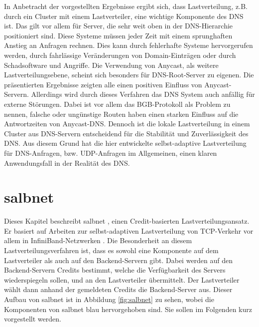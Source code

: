 \documentclass[a4paper, 12pt, BCOR10mm, DIV12, toc=bibliography, toc=listof, german]{scrbook}
\begin{document}
	In Anbetracht der vorgestellten Ergebnisse ergibt sich, dass Lastverteilung, z.B. durch ein
	Cluster mit einem Lastverteiler, eine wichtige Komponente des DNS ist. Das gilt vor allem für
	Server, die sehr weit oben in der DNS-Hierarchie positioniert sind. Diese Systeme müssen jeder Zeit mit einem
	sprunghaften Anstieg an Anfragen rechnen. Dies kann durch fehlerhafte Systeme hervorgerufen werden,
	durch fahrlässige Veränderungen von Domain-Einträgen oder durch Schadsoftware und Angriffe. Die
	Verwendung von Anycast, als weitere Lastverteilungsebene, scheint sich besonders für
	DNS-Root-Server zu eigenen. Die präsentierten Ergebnisse zeigten alle einen positiven Einfluss von
	Anycast-Servern. Allerdings wird durch dieses Verfahren das DNS System auch anfällig für externe
	Störungen. Dabei ist vor allem das BGB-Protokoll als Problem zu nennen, falsche oder ungünstige
	Routen haben einen starken Einfluss auf die Antwortzeiten von Anycast-DNS. Dennoch ist die lokale
	Lastverteilung in einem Cluster aus DNS-Servern entscheidend für die Stabilität und Zuverlässigkeit
	des DNS. Aus diesem Grund hat die hier entwickelte selbst-adaptive Lastverteilung für DNS-Anfragen, bzw.
	UDP-Anfragen im Allgemeinen, einen klaren Anwendungsfall in der Realität des DNS.



	\chapter{salbnet} %
	\label{cha:salbnet}

		Dieses Kapitel beschreibt salbnet \cite{salbnet}, einen Credit-basierten
		Lastverteilungsansatz.  Er basiert auf Arbeiten zur selbst-adaptiven Lastverteilung von
		TCP-Verkehr vor allem in InfiniBand-Netzwerken \cite{zinke2007, scsczile2008,
		schneidenbach2009}. Die Besonderheit an diesem Lastverteilungsverfahren ist, dass es sowohl eine
		Komponente auf dem Lastverteiler als auch auf den Backend-Servern gibt. Dabei werden auf den
		Backend-Servern Credits bestimmt, welche die Verfügbarkeit des Servers wiederspiegeln sollen,
		und an den Lastverteiler übermittelt. Der Lastverteiler wählt dann anhand der gemeldeten
		Credits die Backend-Server aus. Dieser Aufbau von salbnet ist in Abbildung \ref{fig:salbnet} zu
		sehen, wobei die Komponenten von salbnet blau hervorgehoben sind. Sie sollen im Folgenden kurz
		vorgestellt werden.
\end{document}
